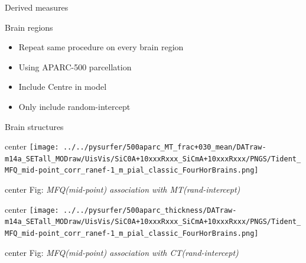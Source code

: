 \begin{frame}{Derived measures}
  \begin{adjustbox}{center}
    \texttt{[image: \{Rplots/Tident.MFQ3-derived.pdf]}}
  \end{adjustbox}\par
\end{frame}

\begin{frame}{Brain regions}
  
  \begin{itemize}
  \item Repeat same procedure on every brain region
  \item Using APARC-500 parcellation
  \end{itemize}

  \begin{itemize}
  \item Include \alert{Centre} in model
  \item Only include random-intercept
  \end{itemize}

\end{frame}

\begin{frame}{Brain structures}


  \begin{adjustbox}{center}
    \texttt{[image: ../../pysurfer/500aparc\_MT\_frac+030\_mean/DATraw-m14a\_SETall\_MODraw/UisVis/SiC0A+10xxxRxxx\_SiCmA+10xxxRxxx/PNGS/Tident\_MFQ\_mid-point\_corr\_ranef-1\_m\_pial\_classic\_FourHorBrains.png]}
  \end{adjustbox}
  \begin{adjustbox}{center}
    \footnotesize{Fig:} \emph{MFQ(mid-point)
      association with MT(rand-intercept)}
  \end{adjustbox}

  \begin{adjustbox}{center}
    \texttt{[image: ../../pysurfer/500aparc\_thickness/DATraw-m14a\_SETall\_MODraw/UisVis/SiC0A+10xxxRxxx\_SiCmA+10xxxRxxx/PNGS/Tident\_MFQ\_mid-point\_corr\_ranef-1\_m\_pial\_classic\_FourHorBrains.png]}
  \end{adjustbox}
  \begin{adjustbox}{center}
    \footnotesize{Fig:} \emph{MFQ(mid-point)
      association with CT(rand-intercept)}
  \end{adjustbox}

\end{frame}


